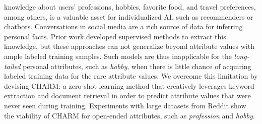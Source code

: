  knowledge about users' professions, hobbies, favorite food, and travel preferences, among others,
is a valuable asset for individualized AI, such as
recommenders or chatbots.
Conversations in social media are
a rich source of data for inferring 
personal facts.
Prior work developed supervised %
methods to extract this knowledge, 
but these approaches
can not generalize beyond 
attribute values 
with ample labeled training samples. 
Such models are thus inapplicable for the \textit{long-tailed} personal attributes, such as \textit{hobby}, when there is little chance of acquiring labeled training data for the rare attribute values.
We overcome
this limitation
by devising CHARM: a
zero-shot learning
method 
that creatively leverages keyword extraction and document retrieval
in order to
predict attribute values 
that were never seen during training.
Experiments with 
large datasets from Reddit
show the viability of CHARM
for open-ended attributes, such as \textit{profession}
and \textit{hobby}.
